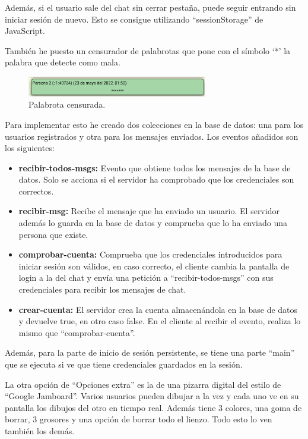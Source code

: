 \documentclass{article}
\begin{document}
Además, si el usuario sale del chat sin cerrar pestaña, puede seguir entrando sin iniciar sesión de nuevo. Esto se consigue utilizando ``sessionStorage'' de JavaScript.

También he puesto un censurador de palabrotas que pone con el símbolo `*' la palabra que detecte como mala.

\begin{figure}[H]
    \centering
    \includegraphics[width=0.7\textwidth]{images/censura.png}
    \caption{Palabrota censurada.}
\end{figure}

Para implementar esto he creado dos colecciones en la base de datos: una para los usuarios registrados y otra para los mensajes enviados. Los eventos añadidos son los siguientes:

\begin{itemize}
    \item \textbf{recibir-todos-msgs: }Evento que obtiene todos los mensajes de la base de datos. Solo se acciona si el servidor ha comprobado que los credenciales son correctos.
    \item \textbf{recibir-msg: }Recibe el mensaje que ha enviado un usuario. El servidor además lo guarda en la base de datos y comprueba que lo ha enviado una persona que existe.
    \item \textbf{comprobar-cuenta: }Comprueba que los credenciales introducidos para iniciar sesión son válidos, en caso correcto, el cliente cambia la pantalla de login a la del chat y envía una petición a ``recibir-todos-msgs'' con sus credenciales para recibir los mensajes de chat.
    \item \textbf{crear-cuenta: }El servidor crea la cuenta almacenándola en la base de datos y devuelve true, en otro caso false. En el cliente al recibir el evento, realiza lo mismo que ``comprobar-cuenta''.
\end{itemize}    

Además, para la parte de inicio de sesión persistente, se tiene una parte ``main'' que se ejecuta si ve que tiene credenciales guardados en la sesión.

\bigskip

La otra opción de ``Opciones extra'' es la de una pizarra digital del estilo de ``Google Jamboard''. Varios usuarios pueden dibujar a la vez y cada uno ve en su pantalla los dibujos del otro en tiempo real. Además tiene 3 colores, una goma de borrar, 3 grosores y una opción de borrar todo el lienzo. Todo esto lo ven también los demás.
\end{document}
